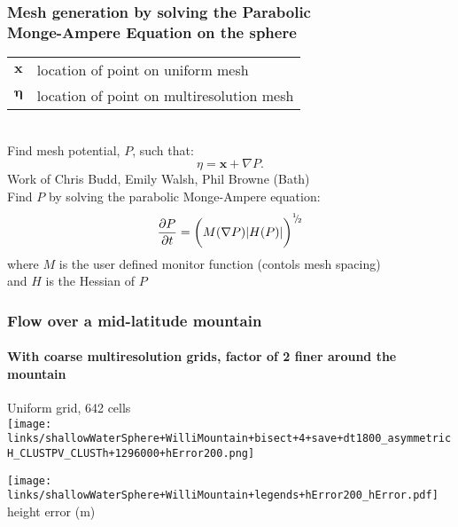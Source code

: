 \begin{frame}
\frametitle{Mesh generation by solving the Parabolic\\
Monge-Ampere Equation on the sphere}

\begin{tabular}{ll}
$\mathbf{x}$ & location of point on uniform mesh\\
$\mathbf{\eta}$ & location of point on multiresolution mesh\\
\end{tabular}\\
Find mesh potential, $P$, such that:
\begin{equation*}
\eta = \mathbf{x} + \nabla P.
\end{equation*}
Work of Chris Budd, Emily Walsh, Phil Browne (Bath)\\
Find $P$ by solving the parabolic Monge-Ampere equation:\\
\begin{equation*}
\frac{\partial P}{\partial t} = \biggl(M(\nabla P) |H(P)|\biggr)^{^1\negthickspace/\negthinspace_2}
\end{equation*}
where $M$ is the user defined monitor function (contols mesh spacing)\\
and $H$ is the Hessian of $P$

\end{frame}

\begin{frame}
\frametitle{Flow over a mid-latitude mountain}
\framesubtitle{With coarse multiresolution grids, factor of 2 finer around the mountain}

\begin{minipage}{0.48\linewidth}
Uniform grid, 642 cells \\
\texttt{[image: links/shallowWaterSphere+WilliMountain+bisect+4+save+dt1800\_asymmetricH\_CLUSTPV\_CLUSTh+1296000+hError200.png]}
\end{minipage}

\texttt{[image: links/shallowWaterSphere+WilliMountain+legends+hError200\_hError.pdf]}  \hfill height error (m)
\end{frame}
